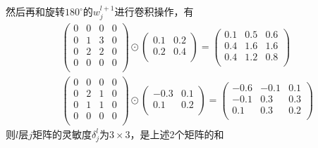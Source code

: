             然后再和旋转$180^\circ$的$w_j^{l+1}$进行卷积操作，有
            \begin{align*}
            &
            \begin{pmatrix}
            0 & 0 & 0 & 0\\
            0 & 1 & 3 & 0\\
            0 & 2 & 2 & 0\\
            0 & 0 & 0 & 0\\
            \end{pmatrix}
            \odot
            \begin{pmatrix}
            0.1 & 0.2 \\
            0.2 & 0.4 \\
            \end{pmatrix}
            =
            \begin{pmatrix}
            0.1 & 0.5 & 0.6\\
            0.4 & 1.6 & 1.6\\
            0.4 & 1.2 & 0.8\\
            \end{pmatrix}\\
            &
            \begin{pmatrix}
            0 & 0 & 0 & 0\\
            0 & 2 & 1 & 0\\
            0 & 1 & 1 & 0\\
            0 & 0 & 0 & 0\\
            \end{pmatrix}
            \odot
            \begin{pmatrix}
            -0.3 & 0.1 \\
            0.1 & 0.2 \\
            \end{pmatrix}
            =
            \begin{pmatrix}
            -0.6 & -0.1 & 0.1\\
            -0.1 & 0.3 & 0.3\\
            0.1 & 0.3 & 0.2\\
            \end{pmatrix}
            \end{align*}
            则$l$层$j$矩阵的灵敏度$\delta_j^l$为$3\times 3$，是上述2个矩阵的和

